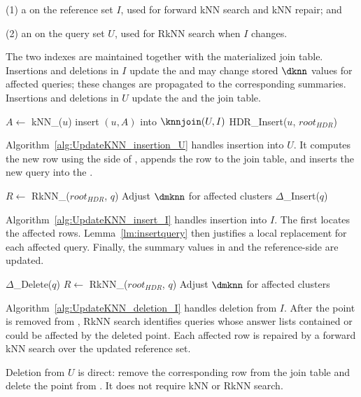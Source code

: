 \noindent(1) a \deltatree on the reference set $I$, used for forward kNN search and kNN repair; and

\noindent(2) an \hdrtree on the query set $U$, used for RkNN search when $I$ changes.

The two indexes are maintained together with the materialized join table. Insertions and deletions in $I$ update the \deltatree and may change stored $\dknn$ values for affected queries; these changes are propagated to the corresponding \hdrtree summaries. Insertions and deletions in $U$ update the \hdrtree and the join table.

\begin{algorithm}[t]
\caption{$\knnjoin$\_Insertion\_U($u$)}
\label{alg:UpdateKNN_insertion_U}
$A\leftarrow$ kNN\_\dualtree($u$)\;
insert $(u,A)$ into $\knnjoin(U,I)$\;
HDR\_Insert($u$, $root_{HDR}$)\;
\end{algorithm}

Algorithm~\ref{alg:UpdateKNN_insertion_U} handles insertion into $U$. It computes the new row using the \deltatree side of \dualtree, appends the row to the join table, and inserts the new query into the \hdrtree.

\begin{algorithm}[t]
\caption{$\knnjoin$\_Insertion\_I($q$)}
\label{alg:UpdateKNN_insert_I}
$R\leftarrow$ RkNN\_\dualtree($root_{HDR}$, $q$)\;
Adjust $\dmknn$ for affected \hdrtree clusters\;
$\Delta$\_Insert($q$)\;
\end{algorithm}

Algorithm~\ref{alg:UpdateKNN_insert_I} handles insertion into $I$. The \hdrtree first locates the affected rows. Lemma~\ref{lm:insertquery} then justifies a local replacement for each affected query. Finally, the summary values in \hdrtree and the reference-side \deltatree are updated.

\begin{algorithm}[t]
\caption{$\knnjoin$\_Deletion\_I($q$)}
\label{alg:UpdateKNN_deletion_I}
$\Delta$\_Delete($q$)\;
$R\leftarrow$ RkNN\_\dualtree($root_{HDR}$, $q$)\;
Adjust $\dmknn$ for affected \hdrtree clusters\;
\end{algorithm}

Algorithm~\ref{alg:UpdateKNN_deletion_I} handles deletion from $I$. After the point is removed from \deltatree, RkNN search identifies queries whose answer lists contained or could be affected by the deleted point. Each affected row is repaired by a forward kNN search over the updated reference set.

Deletion from $U$ is direct: remove the corresponding row from the join table and delete the point from \hdrtree. It does not require kNN or RkNN search.
